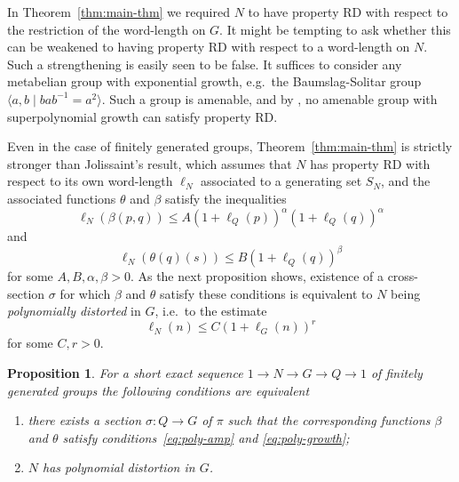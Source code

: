 \documentclass{amsart}
\newtheorem{proposition}[theorem]{Proposition}
\theoremstyle{definition}
\theoremstyle{remark}
\begin{document}
In Theorem~\ref{thm:main-thm} we required $N$ to have
property RD with respect to the restriction of the word-length on
$G$. It might be tempting to ask whether this can be weakened to
having property RD with respect to a word-length on $N$. Such a
strengthening is easily seen to be false. It
suffices to consider any metabelian group with exponential growth,
e.g.\ the Baumslag-Solitar group $\langle a,b \mid
bab^{-1}=a^2\rangle$. Such a group is amenable, and by
\cite[Corollary 3.1.8]{Jolissaint1990}, no amenable group with
superpolynomial growth can satisfy property RD.

Even in the case of finitely generated groups,
Theorem~\ref{thm:main-thm} is strictly stronger than Jolissaint's
result, which assumes that $N$ has property RD with respect to its own
word-length $\ell_N$ associated to a generating set $S_N$, and the
associated functions $\theta$ and $\beta$ satisfy the inequalities
\begin{equation}
  \label{eq:poly-amp}
  \ell_N(\beta(p,q)) \leq A(1+\ell_Q(p))^\alpha(1+\ell_Q(q))^\alpha
\end{equation}
and
\begin{equation}
  \label{eq:poly-growth}
  \ell_N(\theta(q)(s)) \leq B(1+\ell_Q(q))^\beta
\end{equation}
for some $A,B,\alpha,\beta>0$. As the next proposition shows,
existence of a cross-section $\sigma$ for which $\beta$ and $\theta$
satisfy these conditions is equivalent to $N$ being \emph{polynomially
distorted} in $G$, i.e.\ to the estimate
\begin{equation}
  \label{eq:poly-dist}
  \ell_N(n)\leq C(1+\ell_G(n))^r
\end{equation}
for some $C,r>0$.  

\begin{proposition}
  \label{prop:polynomial-distortion}
  For a short exact sequence $1\to N\to G\to Q\to 1$ of finitely
  generated groups the following conditions are equivalent
  \begin{enumerate}
  \item there exists a section $\sigma\colon Q\to G$ of $\pi$ such
    that the corresponding functions $\beta$ and $\theta$ satisfy conditions~\eqref{eq:poly-amp} and \eqref{eq:poly-growth};
  \item $N$ has polynomial distortion in $G$.
  \end{enumerate}
\end{proposition}
\end{document}
